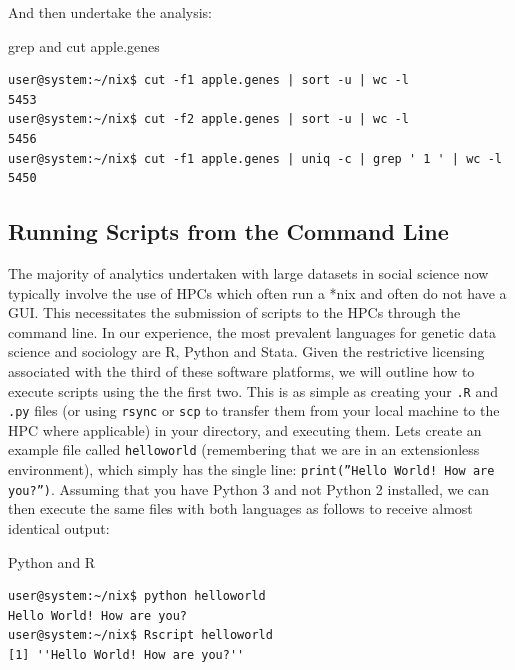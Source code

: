 \documentclass[11pt]{article}
\begin{document}
\noindent
And then undertake the analysis: \\

\begin{listing}[H]
\caption{grep and cut apple.genes}\vspace{-0.1in}
\begin{verbatim}
user@system:~/nix$ cut -f1 apple.genes | sort -u | wc -l
5453 
user@system:~/nix$ cut -f2 apple.genes | sort -u | wc -l
5456 
user@system:~/nix$ cut -f1 apple.genes | uniq -c | grep ' 1 ' | wc -l
5450
\end{verbatim}
\end{listing}

\subsection{Running Scripts from the Command Line}

The majority of analytics undertaken with large datasets in social science now typically involve the use of HPCs which often run a *nix and often do not have a GUI. This necessitates the submission of scripts to the HPCs through the command line. In our experience, the most prevalent languages for genetic data science and sociology are R, Python and Stata. Given the restrictive licensing associated with the third of these software platforms, we will outline how to execute scripts using the the first two. This is as simple as creating your \texttt{.R} and \texttt{.py} files (or using \texttt{rsync} or \texttt{scp} to transfer them from your local machine to the HPC where applicable) in your directory, and executing them. Lets create an example file called \texttt{helloworld} (remembering that we are in an extensionless environment), which simply has the single line: \texttt{print(''Hello World! How are you?'')}. Assuming that you have Python 3 and not Python 2 installed, we can then execute the same files with both languages as follows to receive almost identical output:\\

\begin{listing}[H]
\caption{Python and R}\vspace{-0.1in}
\begin{verbatim}
user@system:~/nix$ python helloworld
Hello World! How are you?
user@system:~/nix$ Rscript helloworld
[1] ''Hello World! How are you?''
\end{verbatim}
\end{listing}
\end{document}
